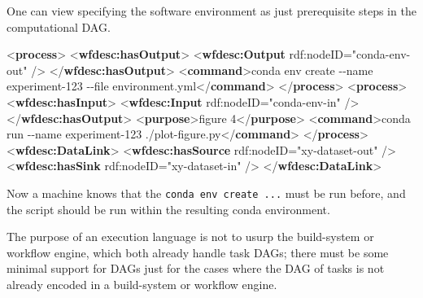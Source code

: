 \documentclass[manuscript,authordraft]{acmart}
\newenvironment{Shaded}{}{}
\newcommand{\KeywordTok}[1]{\textcolor[rgb]{0.00,0.44,0.13}{\textbf{#1}}}
\newcommand{\NormalTok}[1]{#1}
\newcommand{\OtherTok}[1]{\textcolor[rgb]{0.00,0.44,0.13}{#1}}
\newcommand{\StringTok}[1]{\textcolor[rgb]{0.25,0.44,0.63}{#1}}
\begin{document}
One can view specifying the software environment as just prerequisite
steps in the computational DAG.

\small

\begin{Shaded}
\begin{Highlighting}[]
\NormalTok{\textless{}}\KeywordTok{process}\NormalTok{\textgreater{}}
\NormalTok{  \textless{}}\KeywordTok{wfdesc:hasOutput}\NormalTok{\textgreater{}}
\NormalTok{    \textless{}}\KeywordTok{wfdesc:Output}\OtherTok{ rdf:nodeID=}\StringTok{"conda{-}env{-}out"}\NormalTok{ /\textgreater{}}
\NormalTok{  \textless{}/}\KeywordTok{wfdesc:hasOutput}\NormalTok{\textgreater{}}
\NormalTok{  \textless{}}\KeywordTok{command}\NormalTok{\textgreater{}conda env create {-}{-}name experiment{-}123 {-}{-}file environment.yml\textless{}/}\KeywordTok{command}\NormalTok{\textgreater{}}
\NormalTok{\textless{}/}\KeywordTok{process}\NormalTok{\textgreater{}}
\NormalTok{\textless{}}\KeywordTok{process}\NormalTok{\textgreater{}}
\NormalTok{  \textless{}}\KeywordTok{wfdesc:hasInput}\NormalTok{\textgreater{}}
\NormalTok{    \textless{}}\KeywordTok{wfdesc:Input}\OtherTok{ rdf:nodeID=}\StringTok{"conda{-}env{-}in"}\NormalTok{ /\textgreater{}}
\NormalTok{  \textless{}/}\KeywordTok{wfdesc:hasOutput}\NormalTok{\textgreater{}}
\NormalTok{  \textless{}}\KeywordTok{purpose}\NormalTok{\textgreater{}figure 4\textless{}/}\KeywordTok{purpose}\NormalTok{\textgreater{}}
\NormalTok{  \textless{}}\KeywordTok{command}\NormalTok{\textgreater{}conda run {-}{-}name experiment{-}123 ./plot{-}figure.py\textless{}/}\KeywordTok{command}\NormalTok{\textgreater{}}
\NormalTok{\textless{}/}\KeywordTok{process}\NormalTok{\textgreater{}}
\NormalTok{\textless{}}\KeywordTok{wfdesc:DataLink}\NormalTok{\textgreater{}}
\NormalTok{  \textless{}}\KeywordTok{wfdesc:hasSource}\OtherTok{ rdf:nodeID=}\StringTok{"xy{-}dataset{-}out"}\NormalTok{ /\textgreater{}}
\NormalTok{  \textless{}}\KeywordTok{wfdesc:hasSink}\OtherTok{ rdf:nodeID=}\StringTok{"xy{-}dataset{-}in"}\NormalTok{ /\textgreater{}}
\NormalTok{\textless{}/}\KeywordTok{wfdesc:DataLink}\NormalTok{\textgreater{}}
\end{Highlighting}
\end{Shaded}

\normalsize

Now a machine knows that the \texttt{conda\ env\ create\ ...} must be
run before, and the script should be run within the resulting conda
environment.

The purpose of an execution language is not to usurp the build-system or
workflow engine, which both already handle task DAGs; there must be some
minimal support for DAGs just for the cases where the DAG of tasks is
not already encoded in a build-system or workflow engine.
\end{document}
